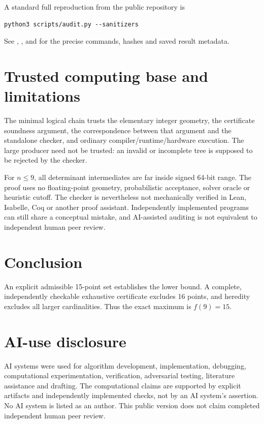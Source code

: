 \documentclass[11pt,a4paper]{article}
\theoremstyle{definition}
\theoremstyle{remark}
\begin{document}
A standard full reproduction from the public repository is
\begin{verbatim}
python3 scripts/audit.py --sanitizers
\end{verbatim}
See , , and
 for the precise commands, hashes and
saved result metadata.

\section{Trusted computing base and limitations}
The minimal logical chain trusts the elementary integer geometry, the
certificate soundness argument, the correspondence between that argument and
the standalone checker, and ordinary compiler/runtime/hardware execution. The
large producer need not be trusted: an invalid or incomplete tree is supposed
to be rejected by the checker.

For $n\le9$, all determinant intermediates are far inside signed 64-bit range.
The proof uses no floating-point geometry, probabilistic acceptance, solver
oracle or heuristic cutoff. The checker is nevertheless not mechanically
verified in Lean, Isabelle, Coq or another proof assistant. Independently
implemented programs can still share a conceptual mistake, and AI-assisted
auditing is not equivalent to independent human peer review.

\section{Conclusion}
An explicit admissible 15-point set establishes the lower bound. A complete,
independently checkable exhaustive certificate excludes 16 points, and
heredity excludes all larger cardinalities. Thus the exact maximum is
$f(9)=15$.

\section*{AI-use disclosure}
AI systems were used for algorithm development, implementation, debugging,
computational experimentation, verification, adversarial testing, literature
assistance and drafting. The computational claims are supported by explicit
artifacts and independently implemented checks, not by an AI system's
assertion. No AI system is listed as an author. This public version does not
claim completed independent human peer review.
\end{document}
